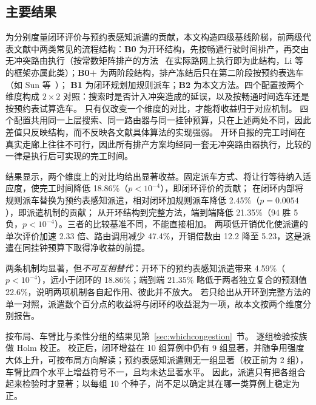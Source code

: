 \documentclass[manuscript,screen,review]{acmart}
\newcommand{\NCases}{10}
\newcommand{\NSeeds}{10}
\newcommand{\GainLoopRule}{18.86\%}      %
\newcommand{\PLoopRule}{<10^{-4}}
\newcommand{\GainProbeOpen}{4.59\%}      %
\newcommand{\PProbeOpen}{<10^{-4}}
\newcommand{\GainProbeLoop}{2.45\%}      %
\newcommand{\PProbeLoop}{=0.0054}
\newcommand{\GainEndToEnd}{21.35\%}      %
\newcommand{\PEndToEnd}{<10^{-4}}
\newcommand{\WinEndToEnd}{94}
\newcommand{\LoseEndToEnd}{5}
\newcommand{\GainIndepProduct}{22.6\%}
\newcommand{\CellsSigLoopAdj}{9}
\newcommand{\CellsSigProbe}{2}
\newcommand{\SpeedupProbe}{2.33}
\newcommand{\RouteCallCut}{47.4\%}
\newcommand{\CostMultBefore}{12.2}
\newcommand{\CostMultAfter}{5.23}
\begin{document}
\subsection{主要结果}

为分别度量闭环评价与预约表感知派遣的贡献，本文构造四级基线阶梯，前两级代表文献中两类常见的流程结构：\textbf{B0} 为开环结构，先按畅通行驶时间排产，再交由无冲突路由执行（按常数矩阵排产的方法~\cite{meng2025cp,qin2026knowledge,jafarian2026integrated} 在实际路网上执行即为此结构，Li 等~\cite{li2026framework} 的框架亦属此类）；\textbf{B0+} 为两阶段结构，排产冻结后只在第二阶段按预约表选车（如 Sun 等~\cite{sun2023integrated}）；
\textbf{B1} 为闭环规划加规则派车；\textbf{B2} 为本文方法。四个配置按两个维度构成 $2\times2$ 对照：搜索时是否计入冲突造成的延误，以及按畅通时间选车还是按预约表试算选车。
只有仅改变一个维度的对比，才能将收益归于对应机制。
四个配置共用同一上层搜索、同一路由器与同一挂钟预算，只在上述两处不同，因此差值只反映结构，而不反映各文献具体算法的实现强弱。
开环自报的完工时间在真实走廊上往往不可行，因此所有排产方案均经同一套无冲突路由器执行，比较的一律是执行后可实现的完工时间。

结果显示，两个维度上的对比均给出显著收益。固定派车方式、将让行等待纳入适应度，使完工时间降低 \GainLoopRule{}（$p\PLoopRule$），即闭环评价的贡献；
在闭环内部将规则派车替换为预约表感知派遣，相对闭环加规则派车降低 \GainProbeLoop{}（$p\PProbeLoop$），即派遣机制的贡献；
从开环结构到完整方法，端到端降低 \GainEndToEnd{}（\WinEndToEnd{} 胜 \LoseEndToEnd{} 负，$p\PEndToEnd$）。三者的比较基准不同，不能直接相加。
两项低开销优化使派遣的单次评价加速 \SpeedupProbe{} 倍、路由调用减少 \RouteCallCut{}，开销倍数由 \CostMultBefore{} 降至 \CostMultAfter{}，这是派遣在同挂钟预算下取得净收益的前提。

两条机制均显著，但\emph{不可互相替代}：开环下的预约表感知派遣带来 \GainProbeOpen{}（$p\PProbeOpen$），远小于闭环的 \GainLoopRule{}；端到端 \GainEndToEnd{} 略低于两者独立复合的预测值 \GainIndepProduct{}，说明两项机制各自起作用、彼此并不放大。
若只给出从开环到完整方法的单一对照，派遣数个百分点的收益将与闭环的收益混为一项，故本文按两个维度分别报告。

按布局、车臂比与柔性分组的结果见第~\ref{sec:whichcongestion}~节。
逐组检验按族做 Holm 校正。
校正后，闭环增益在 \NCases{} 组算例中仍有 \CellsSigLoopAdj{} 组显著，并随争用强度大体上升，可按布局方向解读；预约表感知派遣则无一组显著（校正前为 \CellsSigProbe{} 组），车臂比四个水平上增益符号不一，且均未达显著水平。
因此，派遣只有把各组合起来检验时才显著；以每组 \NSeeds{} 个种子，尚不足以确定其在哪一类算例上稳定为正。
\end{document}
